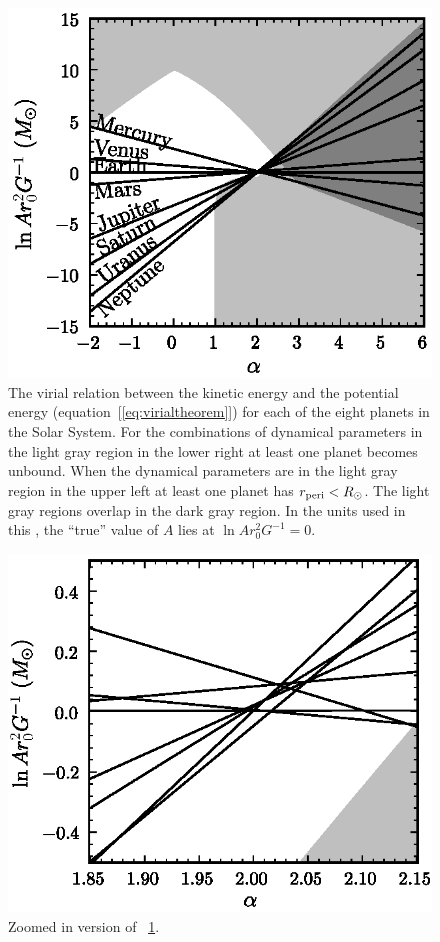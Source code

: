 \clearpage
\begin{figure}
\includegraphics[width=.75\textwidth]{figs_solarsystem/virial_main.ps}
\caption[Virial relation between kinetic and potential energy for each
  of the planets in the Solar System]{The virial relation between the
  kinetic energy and the potential energy
  (equation~[\ref{eq:virialtheorem}]) for each of the eight planets in
  the Solar System. For the combinations of dynamical parameters in
  the light gray region in the lower right at least one planet becomes
  unbound. When the dynamical parameters are in the light gray region
  in the upper left at least one planet has $r_{\mathrm{peri}}<R_\odot$. The
  light gray regions overlap in the dark gray region. In the units
  used in this \figurename, the ``true'' value of $A$ lies at $\ln A
  r_0^2 G^{-1} = 0$.}\label{fig:virial_main}
\end{figure}

\clearpage
\begin{figure}
\includegraphics[width=.75\textwidth]{figs_solarsystem/virial_zoom.ps}
\caption{Zoomed in version of \figurename~\ref{fig:virial_main}.}\label{fig:virial_zoom}
\end{figure}


